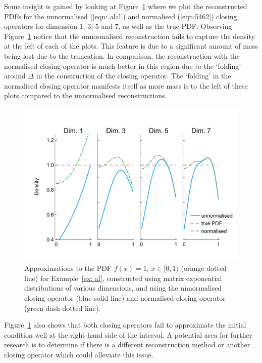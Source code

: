 \begin{example}
Some insight is gained by looking at Figure~\ref{fig: pdf reconstructed} where we plot the reconstructed PDFs for the unnormalised (\ref{eqn: alal}) and normalised (\ref{eqn:5462}) closing operators for dimension 1, 3, 5 and 7, as well as the true PDF. Observing Figure~\ref{fig: pdf reconstructed} notice that the unnormalised reconstruction fails to capture the density at the left of each of the plots. This feature is due to a significant amount of mass being lost due to the truncation. In comparison, the reconstruction with the normalised closing operator is much better in this region due to the `folding' around \(\Delta\) in the construction of the closing operator. The `folding' in the normalised closing operator manifests itself as more mass is to the left of these plots compared to the unnormalised reconstructions. %

\begin{figure}[h]
	\centering
	\includegraphics[width=\textwidth,trim={0cm 1.25cm 0cm 1.25cm},clip]{chapter6/figs/qbdrap_closing_vec/fun4/pdfs_formatted.pdf}
	\caption{Approximations to the PDF \(f(x)=1,\, x\in[0,1)\) (orange dotted line) for Example~\ref{ex: al}, constructed using matrix exponential distributions of various dimensions, and using the unnormalised closing operator (blue solid line) and normalised closing operator (green dash-dotted line).}
	\label{fig: pdf reconstructed}
\end{figure} 
Figure~\ref{fig: pdf reconstructed} also shows that both closing operators fail to approximate the initial condition well at the right-hand side of the interval. A potential area for further research is to determine if there is a different reconstruction method or another closing operator which could alleviate this issue. 
\end{example}

